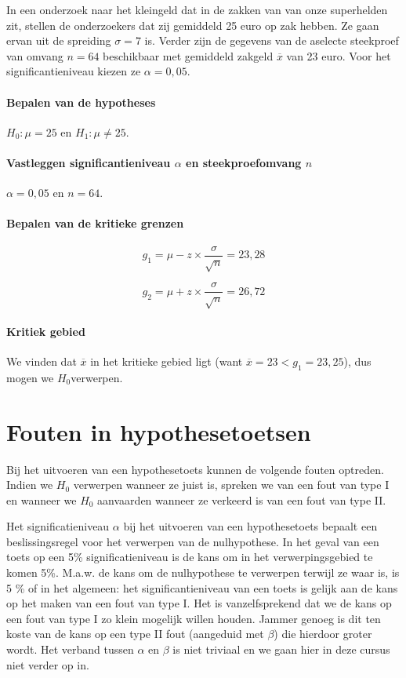 In een onderzoek naar het kleingeld dat in de zakken van van onze superhelden zit, stellen de onderzoekers dat zij gemiddeld 25 euro op zak hebben. Ze gaan ervan uit de spreiding $\sigma = 7$ is. Verder zijn de gegevens van de aselecte steekproef van omvang $n=64$ beschikbaar met gemiddeld zakgeld $\overline{x}$ van 23 euro. Voor het significantieniveau kiezen ze $\alpha = 0,05$.

\paragraph{Bepalen van de hypotheses}

$H_{0} : \mu = 25$ en $H_{1}: \mu \neq 25$.

\paragraph{Vastleggen significantieniveau $\alpha$ en steekproefomvang $n$}

$\alpha = 0,05$ en $n=64$.

\paragraph{Bepalen van de kritieke grenzen}

\[ g_{1} = \mu - z \times \frac{\sigma}{\sqrt{n}} = 23,28 \]

\[ g_{2} = \mu + z \times \frac{\sigma}{\sqrt{n}} = 26,72 \]

\paragraph{Kritiek gebied}

We vinden dat $\overline{x}$ in het kritieke gebied ligt (want $\overline{x} = 23 < g_1 = 23,25$), dus mogen we $H_{0}$verwerpen.

\section{Fouten in hypothesetoetsen}

Bij het uitvoeren van een hypothesetoets kunnen de volgende fouten optreden. Indien we $H_{0}$ verwerpen wanneer ze juist is, spreken we van een fout van type I en wanneer we $H_{0}$ aanvaarden wanneer ze verkeerd is van een fout van type II.

Het significatieniveau $\alpha$ bij het uitvoeren van een hypothesetoets bepaalt een beslissingsregel voor het verwerpen van de nulhypothese. In het geval van een toets op een 5\% significatieniveau is de kans om in het verwerpingsgebied te komen 5\%. M.a.w. de kans om de nulhypothese te verwerpen terwijl ze waar is, is 5 \% of in het algemeen: het significantieniveau van een toets is gelijk aan de kans op het maken van een fout van type I. Het is vanzelfsprekend dat we de kans op een fout van type I zo klein mogelijk willen houden. Jammer genoeg is dit ten koste van de kans op een type II fout (aangeduid met $\beta$) die hierdoor groter wordt. Het verband tussen $\alpha$ en $\beta$ is niet triviaal en we gaan hier in deze cursus niet verder op in.

